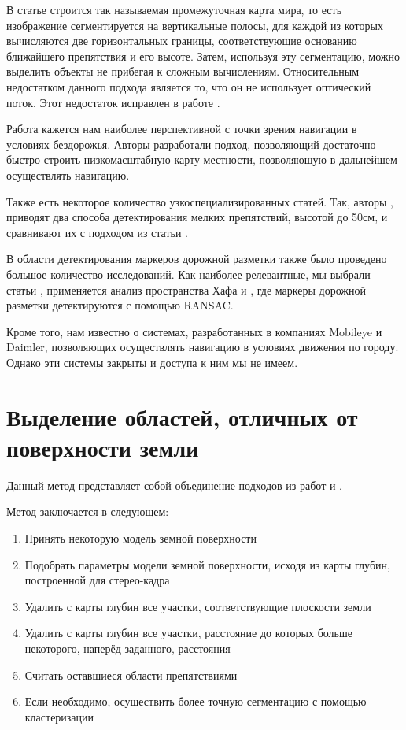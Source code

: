 \documentclass[aps,%
14pt,%
final,%
oneside,
onecolumn,%
musixtex, %
superscriptaddress,%
centertags]{extarticle} %
\begin{document}
В статье \cite{pfeiffer2010efficient} строится так называемая промежуточная карта мира, то есть изображение сегментируется на вертикальные полосы, для каждой из которых вычисляются две горизонтальных границы, соответствующие основанию ближайшего препятствия и его высоте. Затем, используя эту сегментацию, можно выделить объекты не прибегая к сложным вычислениям. Относительным недостатком данного подхода является то, что он не использует оптический поток. Этот недостаток исправлен в работе \cite{benenson2011stixels}.

Работа \cite{broggi2013terrain} кажется нам наиболее перспективной с точки зрения навигации в условиях бездорожья. Авторы разработали подход, позволяющий достаточно быстро строить низкомасштабную карту местности, позволяющую в дальнейшем осуществлять навигацию.

Также есть некоторое количество узкоспециализированных статей. Так, авторы \cite{pinggera2016lost}, приводят два способа детектирования мелких препятствий, высотой до 50см, и сравнивают их с подходом из статьи \cite{pfeiffer2010efficient}.

В области детектирования маркеров дорожной разметки также было проведено большое количество исследований. Как наиболее релевантные, мы выбрали статьи \cite{song2017real}, применяется анализ пространства Хафа и \cite{aly2008real}, где маркеры дорожной разметки детектируются с помощью RANSAC. 

Кроме того, нам известно о системах, разработанных в компаниях Mobileye и Daimler, позволяющих осуществлять навигацию в условиях движения по городу. Однако эти системы закрыты и доступа к ним мы не имеем.

\section{ Выделение областей, отличных от поверхности земли }

Данный метод представляет собой объединение подходов из работ \cite{labayrade2002real} и \cite{broggi2006single}.

Метод заключается в следующем:
\begin{enumerate}
    \item Принять некоторую модель земной поверхности
    \item Подобрать параметры модели земной поверхности, исходя из карты глубин, построенной для стерео-кадра
    \item Удалить с карты глубин все участки, соответствующие плоскости земли
    \item Удалить с карты глубин все участки, расстояние до которых больше некоторого, наперёд заданного, расстояния
    \item Считать оставшиеся области препятствиями
    \item Если необходимо, осуществить более точную сегментацию с помощью кластеризации
\end{enumerate}
\end{document}
